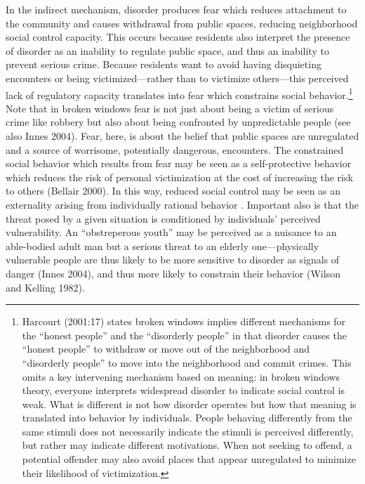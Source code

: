 \documentclass [11pt, proquest] {uwthesis}[2015/03/03]
\begin{document}
In the indirect mechanism, disorder produces fear which reduces attachment to the community and causes withdrawal from public spaces, reducing neighborhood social control capacity. This occurs because residents also interpret the presence of disorder as an inability to regulate public space, and thus an inability to prevent serious crime. Because residents want to avoid having disquieting encounters or being victimized---rather than to victimize others---this perceived lack of regulatory capacity translates into fear which constrains social behavior.\footnote{Harcourt (2001:17) states broken windows implies different mechanisms for the ``honest people'' and the ``disorderly people'' in that disorder causes the ``honest people'' to withdraw or move out of the neighborhood and ``disorderly people'' to move into the neighborhood and commit crimes. This omits a key intervening mechanism based on meaning: in broken windows theory, everyone interprets widespread disorder to indicate social control is weak. What is different is not how disorder operates but how that meaning is translated into behavior by individuals. People behaving differently from the same stimuli does not necessarily indicate the stimuli is perceived differently, but rather may indicate different motivations. When not seeking to offend, a potential offender may also avoid places that appear unregulated to minimize their likelihood of victimization.} Note that in broken windows fear is not just about being a victim of serious crime like robbery but also about being confronted by unpredictable people (see also Innes 2004). Fear, here, is about the belief that public spaces are unregulated and a source of worrisome, potentially dangerous, encounters. The constrained social behavior which results from fear may be seen as a self-protective behavior which reduces the risk of personal victimization at the cost of increasing the risk to others (Bellair 2000). In this way, reduced social control may be seen as an externality arising from individually rational behavior . Important also is that the threat posed by a given situation is conditioned by individuals' perceived vulnerability. An ``obstreperous youth'' may be perceived as a nuisance to an able-bodied adult man but a serious threat to an elderly one---physically vulnerable people are thus likely to be more sensitive to disorder as signals of danger (Innes 2004), and thus more likely to constrain their behavior (Wilson and Kelling 1982).
\end{document}

